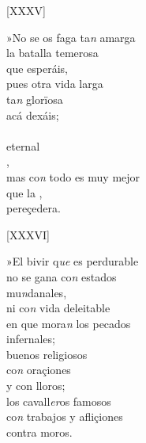 \documentclass[11pt,a4paper,twoside]{article}
\begin{document}
{\begin{center}
	[XXXV]
\end{center}
\pstart
»No se os faga ta\textit{n} amarga\\
la batalla temerosa\\
que esperáis,\\
pues otra vida  larga\\
 ta\textit{n} glorïosa\\ 
acá dexáis;\\
\\
 eternal\\
 ,\\
mas co\textit{n} todo es muy mejor\\
que la  ,\\                                                                       
pereçedera.
\pend

\begin{center}
	[XXXVI]
\end{center}
\pstart
»El bivir q\textit{ue} es perdurable\\
no se gana co\textit{n} estados\\ 
mu\textit{n}danales,\\
ni co\textit{n} vida deleitable\\
en que mora\textit{n} los pecados\\
infernales;\\
 buenos religiosos\\
 co\textit{n} oraçiones\\                                           
y con lloros;\\
los cavall\textit{er}os famosos\\
co\textit{n} trabajos y afliçiones\\ 
contra moros. 
\pend

}
\end{document}
